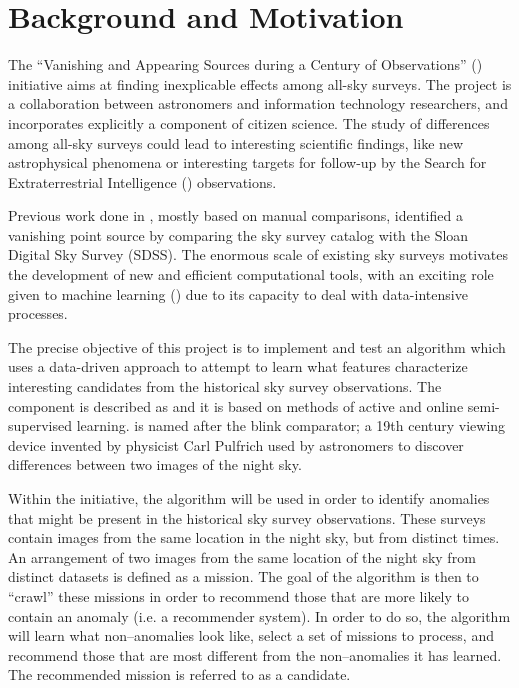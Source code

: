 \section{Background and Motivation} \label{sect:intro:background}

The ``Vanishing and Appearing Sources during a Century of Observations'' (\vasco) initiative aims at finding inexplicable effects among all-sky surveys. The \vasco project is a collaboration between astronomers and information technology researchers, and incorporates explicitly a component of citizen science. The study of differences among all-sky surveys could lead to interesting scientific findings, like new astrophysical phenomena or interesting targets for follow-up by the Search for Extraterrestrial Intelligence (\seti) observations. \newline

Previous work done in \cite{article:our-sky}, mostly based on manual comparisons, identified a vanishing point source by comparing the \usno sky survey catalog with the Sloan Digital Sky Survey (SDSS). The enormous scale of existing sky surveys motivates the development of new and efficient computational tools, with an exciting role given to machine learning (\ml) due to its capacity to deal with data-intensive processes. \newline

The precise objective of this project is to implement and test an \ml algorithm which uses a data-driven approach to attempt to learn what features characterize interesting candidates from the historical sky survey observations. The \ml component is described as \mlblink and it is based on methods of active and online semi-supervised learning. \mlblink is named after the blink comparator; a 19th century viewing device invented by physicist Carl Pulfrich used by astronomers to discover differences between two images of the night sky. \newline

Within the \vasco initiative, the \mlblink algorithm will be used in order to identify anomalies that might be present in the historical sky survey observations. These surveys contain images from the same location in the night sky, but from distinct times. An arrangement of two images from the same location of the night sky from distinct datasets is defined as a mission. The goal of the \mlblink algorithm is then to ``crawl'' these missions in order to recommend those that are more likely to contain an anomaly (i.e. a recommender system). In order to do so, the \mlblink algorithm will learn what non--anomalies look like,  select a set of missions to process, and recommend those that are most different from the non--anomalies it has learned. The recommended mission is referred to as a candidate.